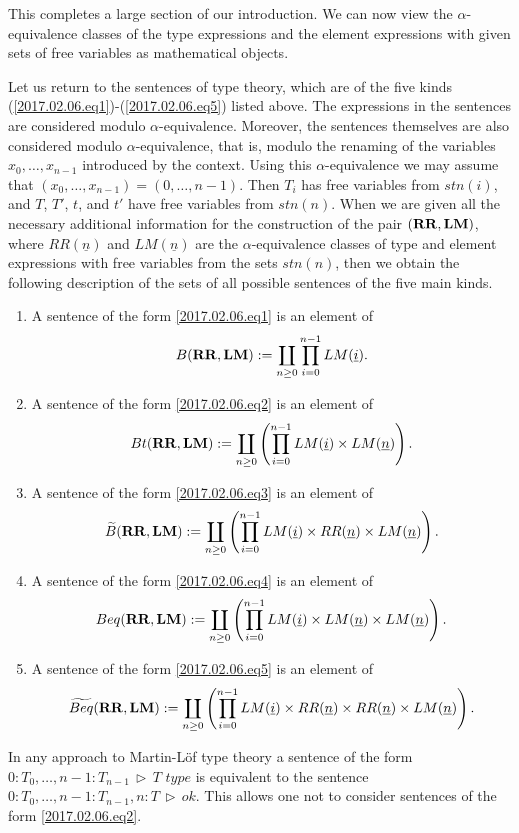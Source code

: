 \documentclass[onecolumn,12pt]{amsart}
\numberwithin{proposition}{subsection}
\newcommand{\uu}{\underline}
\newcommand{\wt}{\widetilde}
\newcommand{\RR}{{\bf RR}}
\newcommand{\LM}{{\bf LM}}
\DeclareMathOperator{\rh}{\,\rhd\,}
\newcommand{\type}{\,\,type}
\newcommand{\ff}[1]{\uu{#1}}
\begin{document}
This completes a large section of our introduction. We can now view the
$\alpha$-equivalence classes of the type expressions and the element expressions with given
sets of free variables as mathematical objects.

Let us return to the sentences of type theory, which are of the five kinds
(\ref{2017.02.06.eq1})-(\ref{2017.02.06.eq5}) listed above.  The expressions in the sentences
are considered modulo $\alpha$-equivalence. Moreover, the sentences
themselves are also considered modulo $\alpha$-equivalence, that is, modulo
the renaming of the variables $x_0,\dots,x_{n-1}$ introduced by the
context. Using this $\alpha$-equivalence we may assume that
$(x_0,\dots,x_{n-1})=(0,\dots,n-1)$. Then $T_i$ has free variables from
$stn(i)$, and $T$, $T'$, $t$, and $t'$ have free variables from $stn(n)$. When we are given
all the necessary additional information for the construction of the pair
$(\RR,\LM)$, where $RR(\ff{n})$ and $LM(\ff{n})$ are the $\alpha$-equivalence classes of
type and element expressions with free variables from the sets $stn(n)$, then we
obtain the following description of the sets of all possible sentences of the
five main kinds.
%
\begin{enumerate}
\item A sentence of the form \ref{2017.02.06.eq1} is an element of
%
$$B(\RR,\LM):=\coprod_{n\ge 0} \prod_{i=0}^{n-1}LM(\ff{i}).$$
%
\item A sentence of the form \ref{2017.02.06.eq2} is an element of
%
$$Bt(\RR,\LM):=\coprod_{n\ge 0} \left(\prod_{i=0}^{n-1}LM(\ff{i})\times LM(\ff{n})\right).$$
%
\item A sentence of the form \ref{2017.02.06.eq3} is an element of
%
$$\wt{B}(\RR,\LM):=\coprod_{n\ge 0} \left(\prod_{i=0}^{n-1}LM(\ff{i})\times RR(\ff{n})\times LM(\ff{n})\right).$$
%
\item A sentence of the form \ref{2017.02.06.eq4} is an element of
%
$$Beq(\RR,\LM):=\coprod_{n\ge 0} \left(\prod_{i=0}^{n-1}LM(\ff{i})\times LM(\ff{n})\times LM(\ff{n})\right).$$
%
\item A sentence of the form \ref{2017.02.06.eq5} is an element of
%
$$\wt{Beq}(\RR,\LM):=\coprod_{n\ge 0} \left(\prod_{i=0}^{n-1}LM(\ff{i})\times RR(\ff{n})\times RR(\ff{n})\times LM(\ff{n})\right).$$
%
\end{enumerate}
%
In any approach to Martin-L\"of type theory a sentence of the form
$0:T_0,\dots,n-1:T_{n-1}\rh T\type$ is equivalent to the sentence $0:T_0,\dots,
n-1:T_{n-1},n:T\rh ok$. This allows one not to consider sentences of the form
\ref{2017.02.06.eq2}.
\end{document}
